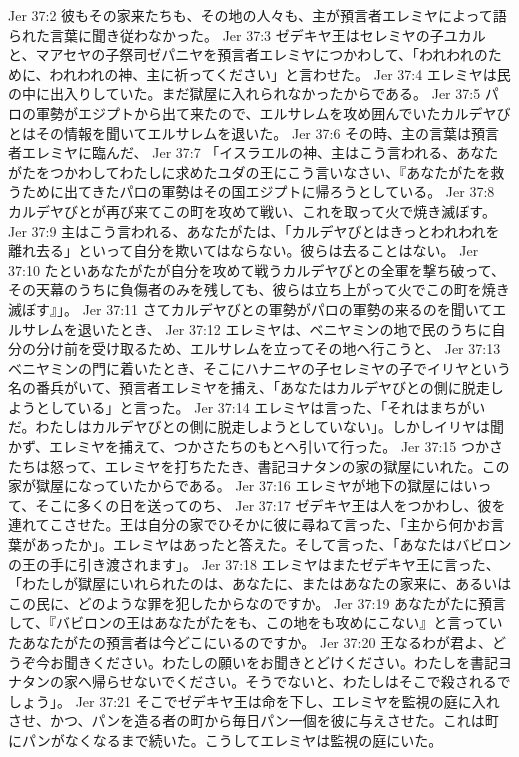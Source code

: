 Jer 37:2  彼もその家来たちも、その地の人々も、主が預言者エレミヤによって語られた言葉に聞き従わなかった。
Jer 37:3  ゼデキヤ王はセレミヤの子ユカルと、マアセヤの子祭司ゼパニヤを預言者エレミヤにつかわして、「われわれのために、われわれの神、主に祈ってください」と言わせた。
Jer 37:4  エレミヤは民の中に出入りしていた。まだ獄屋に入れられなかったからである。
Jer 37:5  パロの軍勢がエジプトから出て来たので、エルサレムを攻め囲んでいたカルデヤびとはその情報を聞いてエルサレムを退いた。
Jer 37:6  その時、主の言葉は預言者エレミヤに臨んだ、
Jer 37:7  「イスラエルの神、主はこう言われる、あなたがたをつかわしてわたしに求めたユダの王にこう言いなさい、『あなたがたを救うために出てきたパロの軍勢はその国エジプトに帰ろうとしている。
Jer 37:8  カルデヤびとが再び来てこの町を攻めて戦い、これを取って火で焼き滅ぼす。
Jer 37:9  主はこう言われる、あなたがたは、「カルデヤびとはきっとわれわれを離れ去る」といって自分を欺いてはならない。彼らは去ることはない。
Jer 37:10  たといあなたがたが自分を攻めて戦うカルデヤびとの全軍を撃ち破って、その天幕のうちに負傷者のみを残しても、彼らは立ち上がって火でこの町を焼き滅ぼす』」。
Jer 37:11  さてカルデヤびとの軍勢がパロの軍勢の来るのを聞いてエルサレムを退いたとき、
Jer 37:12  エレミヤは、ベニヤミンの地で民のうちに自分の分け前を受け取るため、エルサレムを立ってその地へ行こうと、
Jer 37:13  ベニヤミンの門に着いたとき、そこにハナニヤの子セレミヤの子でイリヤという名の番兵がいて、預言者エレミヤを捕え、「あなたはカルデヤびとの側に脱走しようとしている」と言った。
Jer 37:14  エレミヤは言った、「それはまちがいだ。わたしはカルデヤびとの側に脱走しようとしていない」。しかしイリヤは聞かず、エレミヤを捕えて、つかさたちのもとへ引いて行った。
Jer 37:15  つかさたちは怒って、エレミヤを打ちたたき、書記ヨナタンの家の獄屋にいれた。この家が獄屋になっていたからである。
Jer 37:16  エレミヤが地下の獄屋にはいって、そこに多くの日を送ってのち、
Jer 37:17  ゼデキヤ王は人をつかわし、彼を連れてこさせた。王は自分の家でひそかに彼に尋ねて言った、「主から何かお言葉があったか」。エレミヤはあったと答えた。そして言った、「あなたはバビロンの王の手に引き渡されます」。
Jer 37:18  エレミヤはまたゼデキヤ王に言った、「わたしが獄屋にいれられたのは、あなたに、またはあなたの家来に、あるいはこの民に、どのような罪を犯したからなのですか。
Jer 37:19  あなたがたに預言して、『バビロンの王はあなたがたをも、この地をも攻めにこない』と言っていたあなたがたの預言者は今どこにいるのですか。
Jer 37:20  王なるわが君よ、どうぞ今お聞きください。わたしの願いをお聞きとどけください。わたしを書記ヨナタンの家へ帰らせないでください。そうでないと、わたしはそこで殺されるでしょう」。
Jer 37:21  そこでゼデキヤ王は命を下し、エレミヤを監視の庭に入れさせ、かつ、パンを造る者の町から毎日パン一個を彼に与えさせた。これは町にパンがなくなるまで続いた。こうしてエレミヤは監視の庭にいた。
